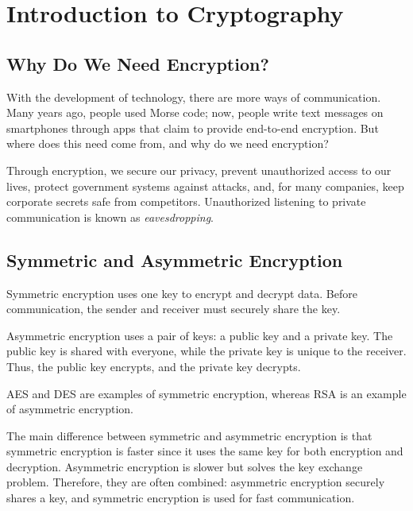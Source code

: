\section{Introduction to Cryptography}

\subsection{Why Do We Need Encryption?}

With the development of technology, there are more ways of communication. 
Many years ago, people used Morse code; now, people write text messages on smartphones through apps that claim to provide end-to-end encryption. 
But where does this need come from, and why do we need encryption?

Through encryption, we secure our privacy, prevent unauthorized access to our lives, protect government systems against attacks, and, for many companies, keep corporate secrets safe from competitors. 
Unauthorized listening to private communication is known as \textit{eavesdropping}.

\subsection{Symmetric and Asymmetric Encryption}

Symmetric encryption uses one key to encrypt and decrypt data. 
Before communication, the sender and receiver must securely share the key.

Asymmetric encryption uses a pair of keys: a public key and a private key. 
The public key is shared with everyone, while the private key is unique to the receiver. 
Thus, the public key encrypts, and the private key decrypts.

AES and DES are examples of symmetric encryption, whereas RSA is an example of asymmetric encryption.

The main difference between symmetric and asymmetric encryption is that symmetric encryption is faster since it uses the same key for both encryption and decryption. 
Asymmetric encryption is slower but solves the key exchange problem. Therefore, they are often combined: asymmetric encryption securely shares a key, and symmetric encryption is used for fast communication.